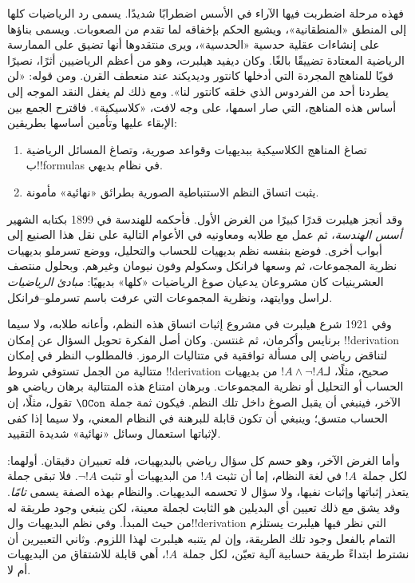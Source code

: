\documentclass[../../../include/open-logic-section]{subfiles}
\begin{document}
فهذه مرحلة اضطربت فيها الآراء في الأسس اضطرابًا شديدًا.
يسمى رد الرياضيات كلها إلى المنطق «المنطقانية»، ويشيع الحكم
بإخفاقه لما تقدم من الصعوبات. ويسمى بناؤها على إنشاءات
عقلية حدسية «الحدسية»، ويرى منتقدوها أنها تضيق على الممارسة
الرياضية المعتادة تضييقًا بالغًا. وكان ديفيد هيلبرت، وهو
من أعظم الرياضيين أثرًا، نصيرًا قويًا للمناهج المجردة التي
أدخلها كانتور وديديكند عند منعطف القرن. ومن قوله:
«لن يطردنا أحد من الفردوس الذي خلقه كانتور لنا».
ومع ذلك لم يغفل النقد الموجه إلى أساس هذه المناهج، التي
صار اسمها، على وجه لافت، «كلاسيكية». فاقترح الجمع بين
الإبقاء عليها وتأمين أساسها بطريقين:
\begin{enumerate}
\item تصاغ المناهج الكلاسيكية ببديهيات وقواعد صورية، وتصاغ
  المسائل الرياضية ب!!{formula}s في نظام بديهي.
\item يثبت اتساق النظم الاستنباطية الصورية بطرائق «نهائية»
  مأمونة.
\end{enumerate}

وقد أنجز هيلبرت قدرًا كبيرًا من الغرض الأول. فأحكمه للهندسة
في 1899 بكتابه الشهير \emph{أسس الهندسة}، ثم عمل مع طلابه
ومعاونيه في الأعوام التالية على نقل هذا الصنيع إلى أبواب
أخرى. فوضع بنفسه نظم بديهيات للحساب والتحليل، ووضع تسرملو
بديهيات نظرية المجموعات، ثم وسعها فرانكل وسكولم وفون نيومان
وغيرهم. وبحلول منتصف العشرينيات كان مشروعان يدعيان صوغ
الرياضيات «كلها» بديهيًا: \emph{مبادئ الرياضيات} لراسل
ووايتهد، ونظرية المجموعات التي عرفت باسم تسرملو--فرانكل.

وفي 1921 شرع هيلبرت في مشروع إثبات اتساق هذه النظم،
وأعانه طلابه، ولا سيما برنايس وأكرمان، ثم غنتسن.
وكان أصل الفكرة تحويل السؤال عن إمكان !!{derivation}
لتناقض رياضي إلى مسألة توافقية في متتاليات الرموز.
فالمطلوب النظر في إمكان متتالية من الجمل تستوفي شروط
!!{derivation} صحيح، مثلًا، لـ$!A\land\lnot !A$ من
بديهيات الحساب أو التحليل أو نظرية المجموعات. وبرهان امتناع
هذه المتتالية برهان رياضي هو الآخر، فينبغي أن يقبل الصوغ
داخل تلك النظم. فيكون ثمة جملة $\OCon$ تقول، مثلًا،
إن الحساب متسق؛ وينبغي أن تكون قابلة للبرهنة في النظام
المعني، ولا سيما إذا كفى لإثباتها استعمال وسائل «نهائية»
شديدة التقييد.

وأما الغرض الآخر، وهو حسم كل سؤال رياضي بالبديهيات،
فله تعبيران دقيقان. أولهما: لكل جملة~$!A$ في لغة النظام،
إما أن تثبت $!A$ من البديهيات أو تثبت $\lnot !A$.
فلا تبقى جملة يتعذر إثباتها وإثبات نفيها، ولا سؤال لا
تحسمه البديهيات. والنظام بهذه الصفة يسمى \emph{تامًا}.
وقد يشق مع ذلك تعيين أي البديلين هو الثابت لجملة معينة،
لكن ينبغي وجود طريقة له من حيث المبدأ. وفي نظم البديهيات
وال!!{derivation} التي نظر فيها هيلبرت يستلزم التمام
بالفعل وجود تلك الطريقة، وإن لم يتنبه هيلبرت لهذا اللزوم.
وثاني التعبيرين أن نشترط ابتداءً طريقة حسابية آلية تعيّن،
لكل جملة~$!A$، أهي قابلة للاشتقاق من البديهيات أم لا.
\end{document}
